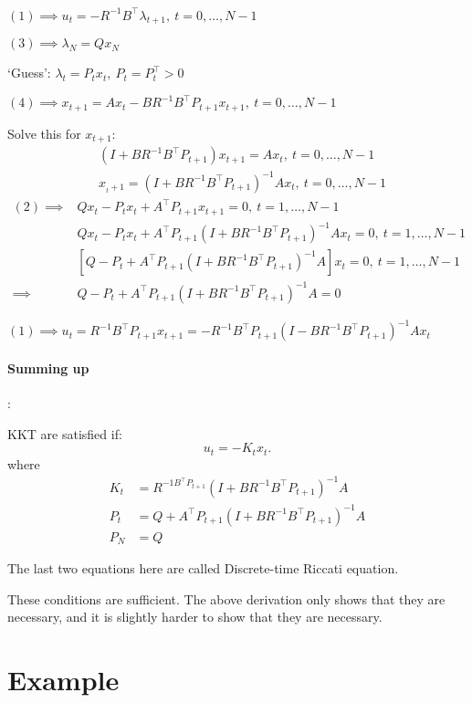 \documentclass{article}
\begin{document}
$(1) \implies u_t = -R^{-1}B^{\top}\lambda_{t+1} ,\ t=0,\dots,N-1$

\medskip $(3) \implies \lambda_N = Qx_N$

\medskip `Guess': $\lambda_t = P_t x_t ,\ P_t = P_t^{\top} > 0$

\medskip $(4) \implies x_{t+1} = Ax_t - BR^{-1}B^{\top}P_{t+1}x_{t+1},\  t=0,\dots,N-1$

Solve this for $x_{t+1}$:
\begin{align*}
   & (I+BR^{-1}B^{\top}P_{t+1})x_{t+1} = Ax_t,\ t=0,\dots,N-1        \\
   & x_{_t+1} = (I+BR^{-1}B^{\top}P_{t+1})^{-1}Ax_t ,\ t=0,\dots,N-1
\end{align*}
\begin{align*}
  (2) \implies & Qx_t - P_t x_t + A^{\top}P_{t+1} x_{t+1} = 0,\  t=1,\dots,N-1                          \\
               & Qx_t - P_tx_t + A^{\top}P_{t+1}(I+BR^{-1}B^{\top}P_{t+1})^{-1}Ax_t = 0,\ t=1,\dots,N-1 \\
               & [Q -P_t+A^{\top}P_{t+1}(I+BR^{-1}B^{\top}P_{t+1})^{-1}A]x_t = 0 ,\ t = 1,\dots,N-1     \\
  \implies     & Q -P_t+A^{\top}P_{t+1}(I+BR^{-1}B^{\top}P_{t+1})^{-1}A = 0
\end{align*}

$(1) \implies u_t = R^{-1}B^{\top}P_{t+1}x_{t+1} = -R^{-1}B^{\top}P_{t+1}(I-BR^{-1}B^{\top}P_{t+1})^{-1}Ax_t$

\paragraph{Summing up}: 

\medskip KKT are satisfied if:
\[
  u_t = -K_t x_t
.\] 
where
\begin{align*}
  K_t &= R^{-1B^{\top}P_{t+1}}(I + BR^{-1}B^{\top}P_{t+1})^{-1}A \\ 
  P_t &= Q + A^{\top}P_{t+1}(I+BR^{-1}B^{\top}P_{t+1})^{-1}A \\ 
  P_N &= Q
\end{align*}

The last two equations here are called Discrete-time Riccati equation. 

\medskip These conditions are sufficient. The above derivation only shows that they are necessary, and it is slightly harder to show that they 
are necessary. 

\section{Example}
\end{document}
